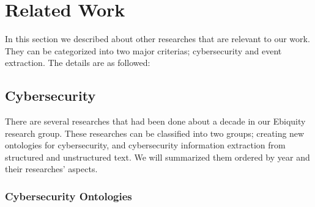 \chapter{Related Work}
\thispagestyle{plain}

\label{Chapter2}

In this section we described about other researches that are relevant to our work. They can be categorized into two major criterias; cybersecurity and event extraction. The details are as followed:


\section{Cybersecurity}
\label{CyberResearch}

	There are several researches that had been done about a decade in our Ebiquity research group. These researches can be classified into two groups; creating new ontologies for cybersecurity, and cybersecurity information extraction from structured and unstructured text. We will summarized them ordered by year and their researches’ aspects. 

\subsection{Cybersecurity Ontologies}

